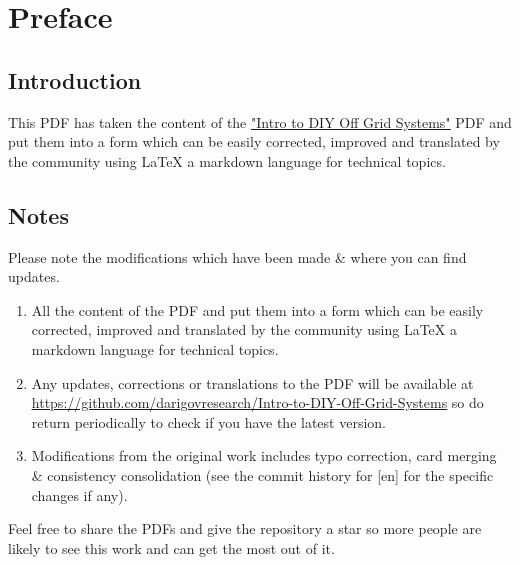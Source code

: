\documentclass{article}
\theoremstyle{definition}
\theoremstyle{definition}
\theoremstyle{remark}
\begin{document}
\newpage

\tableofcontents

\newpage

{\color{blue}\section{Preface}} %
\label{sec:preface}

  {\color{blue}\subsection*{Introduction}} %
  \label{sub:introduction}
  
    This PDF has taken the content of the \href{https://www.demandenergyequality.org/get-started-with-offgrid}{\underline{"Intro to DIY Off Grid Systems"}} PDF and put them into a form which can be easily corrected, improved and translated by the community using LaTeX a markdown language for technical topics.


  {\color{blue}\subsection*{Notes}} %
  \label{sub:notes}

    Please note the modifications which have been made \& where you can find updates.

    \begin{enumerate}
      \item All the content of the PDF and put them into a form which can be easily corrected, improved and translated by the community using LaTeX a markdown language for technical topics.
      \item Any updates, corrections or translations to the PDF will be available at \href{https://github.com/darigovresearch/Intro-to-DIY-Off-Grid-Systems}{\underline{https://github.com/darigovresearch/Intro-to-DIY-Off-Grid-Systems}} so do return periodically to check if you have the latest version.
      \item Modifications from the original work includes typo correction, card merging \& consistency consolidation (see the commit history for [en] for the specific changes if any).
    \end{enumerate}

    Feel free to share the PDFs and give the repository a star so more people are likely to see this work and can get the most out of it.
\end{document}
